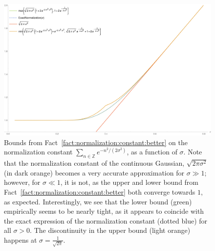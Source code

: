 \documentclass{jpcfinal} %
\newcommand{\Z}{\mathbb{Z}}
\begin{document}
\begin{figure}[ht]
    \centering
    \includegraphics[width=1.00\textwidth]{normalizationconstant}
    \caption{Bounds from Fact~\ref{fact:normalization:constant:better} on the normalization constant $\sum_{n\in\Z} e^{-n^2/(2\sigma^2)}$, as a function of $\sigma$. Note that the normalization constant of the continuous Gaussian, $\sqrt{2\pi\sigma^2}$ (in dark orange) becomes a very accurate approximation for $\sigma \gg 1$; however, for $\sigma \ll 1$, it is not, as the upper and lower bound from Fact~\ref{fact:normalization:constant:better} both converge towards $1$, as expected. Interestingly, we see that the lower bound (green) empirically seems to be nearly tight, as it appears to coincide with the exact expression of the normalization constant (dotted blue) for all $\sigma >0$. The discontinuity in the upper bound (light orange) happens at $\sigma=\frac{1}{\sqrt{2\pi}}$.}
    \label{fig:normalization:constant}
\end{figure}
\end{document}
